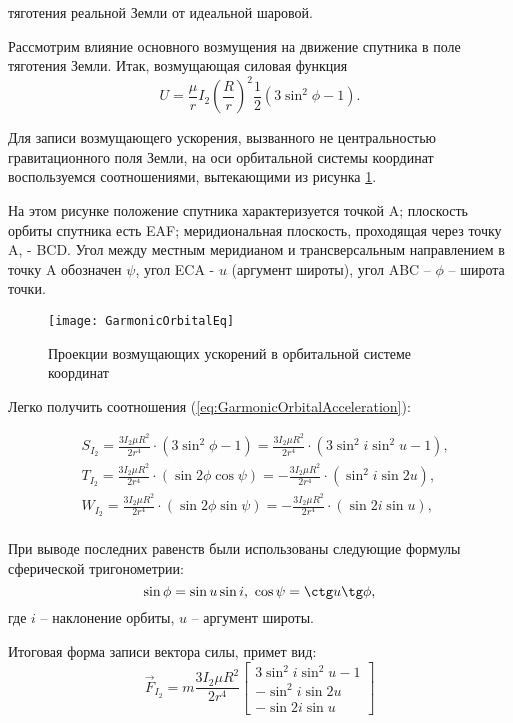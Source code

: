 тяготения реальной Земли от идеальной шаровой.\par
Рассмотрим влияние основного возмущения на движение спутника в поле тяготения Земли.
Итак, возмущающая силовая функция
\begin{equation}
  U = \frac{\mu}{r}I_2\left(\frac{R}{r}\right)^2 \frac{1}{2}(3\sin^2\phi - 1).
\end{equation}\par
  Для записи возмущающего ускорения, вызванного не центральностью гравитационного
поля Земли, на оси орбитальной системы координат воспользуемся соотношениями,
вытекающими из рисунка \ref{fig:GarmonicOrbitalEq}.\par
  На этом рисунке положение спутника характеризуется точкой A; плоскость орбиты
спутника есть EAF; меридиональная плоскость, проходящая через точку A, - BCD.
Угол между местным меридианом и трансверсальным направлением в точку A обозначен
$\psi$, угол ECA - $u$ (аргумент широты), угол ABC -- $\phi$ -- широта точки.
\begin{figure}[h]
  \centering
  \texttt{[image: GarmonicOrbitalEq]}
  \caption{Проекции возмущающих ускорений в орбитальной системе координат}
  \label{fig:GarmonicOrbitalEq}
\end{figure}\par
Легко получить соотношения (\ref{eq:GarmonicOrbitalAcceleration}):\par
\begin{equation} \label{eq:GarmonicOrbitalAcceleration}
  \begin{aligned}
    & S_{I_2} = \frac{3I_2\mu R^2}{2r^4} \cdot (3\sin^2\phi - 1) = \frac{3I_2\mu R^2}{2r^4} \cdot (3\sin^2 i\sin^2 u - 1), \\
    & T_{I_2} = \frac{3I_2\mu R^2}{2r^4} \cdot (\sin2\phi\cos\psi) = - \frac{3I_2\mu R^2}{2r^4} \cdot (\sin^2 i\sin2 u), \\
    & W_{I_2} = \frac{3I_2\mu R^2}{2r^4} \cdot (\sin2\phi\sin\psi) = -\frac{3I_2\mu R^2}{2r^4} \cdot (\sin2 i\sin u), \\
  \end{aligned}
\end{equation}\par
При выводе последних равенств были использованы следующие формулы сферической
тригонометрии:
\begin{equation}
  \sin\phi = \sin u \sin i,\,\, \cos\psi = \ctg u \tg\phi,
\end{equation}
где $i$ -- наклонение орбиты, $u$ -- аргумент широты.\par
    Итоговая форма записи вектора силы, примет вид:
\begin{equation}
    \vec{F}_{I_2} = m\frac{3I_2\mu R^2}{2r^4}\begin{bmatrix}
               3\sin^2 i\sin^2 u - 1 \\
               -\sin^2 i\sin2 u \\
               -\sin2 i\sin u

\end{bmatrix}
\end{equation}
